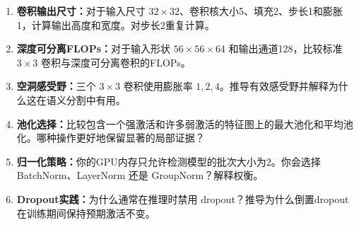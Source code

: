 \begin{enumerate}
    \item \textbf{卷积输出尺寸：}对于输入尺寸 $32\times32$、卷积核大小5、填充2、步长1和膨胀1，计算输出高度和宽度。对步长2重复计算。

    \item \textbf{深度可分离FLOPs：}对于输入形状 $56\times56\times64$ 和输出通道128，比较标准 $3\times3$ 卷积与深度可分离卷积的FLOPs。

    \item \textbf{空洞感受野：}三个 $3\times3$ 卷积使用膨胀率 $1, 2, 4$。推导有效感受野并解释为什么这在语义分割中有用。

    \item \textbf{池化选择：}比较包含一个强激活和许多弱激活的特征图上的最大池化和平均池化。哪种操作更好地保留显著的局部证据？

    \item \textbf{归一化策略：}你的GPU内存只允许检测模型的批次大小为2。你会选择 BatchNorm、LayerNorm 还是 GroupNorm？解释权衡。

    \item \textbf{Dropout实践：}为什么通常在推理时禁用 dropout？推导为什么倒置dropout在训练期间保持预期激活不变。
\end{enumerate}
